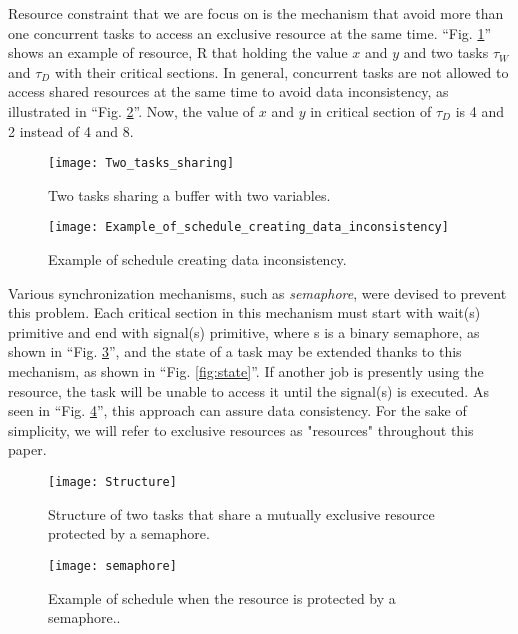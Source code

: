 Resource constraint that we are focus on is the mechanism that avoid more than one concurrent tasks to access an exclusive resource at the same time. ``Fig. \ref{fig:Two_tasks_sharing}'' shows an example of resource, R that holding the value $x$ and $y$ and two tasks $\tau_{W}$ and $\tau_{D}$ with their critical sections. In general, concurrent tasks are not allowed to access shared resources at the same time to avoid data inconsistency, as illustrated in ``Fig. \ref{fig:Example_of_schedule_creating_data_inconsistency}''. Now, the value of $x$ and $y$ in critical section of $\tau_{D}$ is 4 and 2 instead of 4 and 8.

\begin{figure}[ht]
    \centering
    \texttt{[image: Two\_tasks\_sharing]}
    \caption{ Two tasks sharing a buffer with two variables. \cite{b5}}
    \label{fig:Two_tasks_sharing}
\end{figure}

\begin{figure}[ht]
    \centering
    \texttt{[image: Example\_of\_schedule\_creating\_data\_inconsistency]}
    \caption{Example of schedule creating data inconsistency. \cite{b5}}
    \label{fig:Example_of_schedule_creating_data_inconsistency}
\end{figure}

Various synchronization mechanisms, such as \textit{semaphore}, were devised to prevent this problem. Each critical section in this mechanism must start with wait(s) primitive and end with signal(s) primitive, where s is a binary semaphore, as shown in ``Fig. \ref{fig:Structure}'', and the state of a task may be extended thanks to this mechanism, as shown in ``Fig. \ref{fig:state}''. If another job is presently using the resource, the task will be unable to access it until the signal(s) is executed. As seen in ``Fig. \ref{fig:semaphore}'', this approach can assure data consistency. For the sake of simplicity, we will refer to exclusive resources as "resources" throughout this paper.

\begin{figure}[ht]
    \centering
    \texttt{[image: Structure]}
    \caption{Structure of two tasks that share a mutually exclusive resource protected by
a semaphore. \cite{b5}}
    \label{fig:Structure}
\end{figure}


\begin{figure}[ht]
    \centering
    \texttt{[image: semaphore]}
    \caption{Example of schedule when the resource is protected by a semaphore.. \cite{b5}}
    \label{fig:semaphore}
\end{figure}


